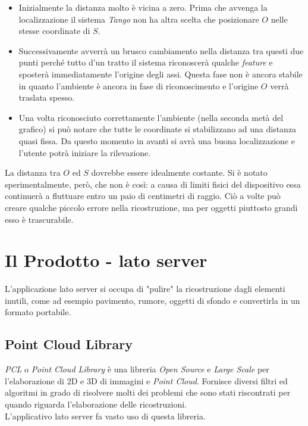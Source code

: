 \begin{itemize}
	\item Inizialmente la distanza molto è vicina a zero. Prima che avvenga la localizzazione il sistema \emph{Tango} non ha altra scelta che posizionare $O$ nelle stesse coordinate di $S$.
	\item Successivamente avverrà un brusco cambiamento nella distanza tra questi due punti perché tutto d'un tratto il sistema riconoscerà qualche \emph{feature} e sposterà immediatamente l'origine degli assi. Questa fase non è  ancora stabile in quanto l'ambiente è ancora in fase di riconoscimento e l'origine $O$ verrà traslata spesso.
	\item Una volta riconosciuto correttamente l'ambiente (nella seconda metà del grafico) si può notare che tutte le coordinate si stabilizzano ad una distanza quasi fissa. Da questo momento in avanti si avrà una buona localizzazione e l'utente potrà iniziare la rilevazione.
\end{itemize}
La distanza tra $O$ ed $S$ dovrebbe essere idealmente costante. Si è notato sperimentalmente, però, che non è così: a causa di limiti fisici del dispositivo essa continuerà a fluttuare entro un paio di centimetri di raggio. Ciò a volte può creare qualche piccolo errore nella ricostruzione, ma per oggetti piuttosto grandi esso è trascurabile.


\section{Il Prodotto - lato server}
L'applicazione lato server si occupa di "pulire" la ricostruzione dagli elementi inutili, come ad esempio pavimento, rumore, oggetti di sfondo e convertirla in un formato portabile.\\
\subsection{Point Cloud Library}
\emph{PCL} o \emph{Point Cloud Library} è una libreria \emph{Open Source} e \emph{Large Scale} per l'elaborazione di 2D e 3D di immagini e \emph{Point Cloud}. Fornisce diversi filtri ed algoritmi in grado di risolvere molti dei problemi che sono stati riscontrati per quando riguarda l'elaborazione delle ricostruzioni.\\
L'applicativo lato server fa vasto uso di questa libreria.
